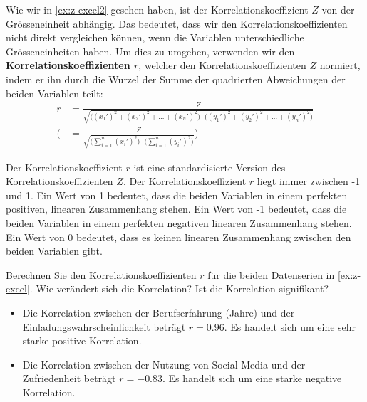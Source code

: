 Wie wir in \cref{ex:z-excel2} gesehen haben, ist der Korrelationskoeffizient \(Z\) von der Grösseneinheit abhängig. Das bedeutet, dass wir den Korrelationskoeffizienten nicht direkt vergleichen können, wenn die Variablen unterschiedliche Grösseneinheiten haben. Um dies zu umgehen, verwenden wir den \textbf{Korrelationskoeffizienten \(r\)}, welcher den Korrelationskoeffizienten \(Z\) normiert, indem er ihn durch die Wurzel der Summe der quadrierten Abweichungen der beiden Variablen teilt:
\begin{equation}
    \begin{aligned}
        r      & = \frac{Z}{\sqrt{\Big((x_1')^2 + (x_2')^2 + \dots + (x_n')^2\Big) \cdot \Big((y_1')^2 + (y_2')^2 + \dots + (y_n')^2\Big)}} \\
        \Bigg( & = \frac{Z}{\sqrt{\Big(\sum_{i=1}^n (x_i')^2\Big) \cdot \Big(\sum_{i=1}^n (y_i')^2\Big)}}\Bigg)
    \end{aligned}
\end{equation}


Der Korrelationskoeffizient \(r\) ist eine standardisierte Version des Korrelationskoeffizienten \(Z\). Der Korrelationskoeffizient \(r\) liegt immer zwischen -1 und 1. Ein Wert von 1 bedeutet, dass die beiden Variablen in einem perfekten positiven, linearen Zusammenhang stehen. Ein Wert von -1 bedeutet, dass die beiden Variablen in einem perfekten negativen linearen Zusammenhang stehen. Ein Wert von 0 bedeutet, dass es keinen linearen Zusammenhang zwischen den beiden Variablen gibt.

\begin{myexercise}
    Berechnen Sie den Korrelationskoeffizienten \(r\) für die beiden Datenserien in \cref{ex:z-excel}. Wie verändert sich die Korrelation? Ist die Korrelation signifikant?
    \begin{myanswer}
        \begin{itemize}
            \item Die Korrelation zwischen der Berufserfahrung (Jahre) und der Einladungswahrscheinlichkeit beträgt \(r = 0.96\). Es handelt sich um eine sehr starke positive Korrelation.
            \item Die Korrelation zwischen der Nutzung von Social Media und der Zufriedenheit beträgt \(r = -0.83\). Es handelt sich um eine starke negative Korrelation.
        \end{itemize}
    \end{myanswer}
\end{myexercise}

